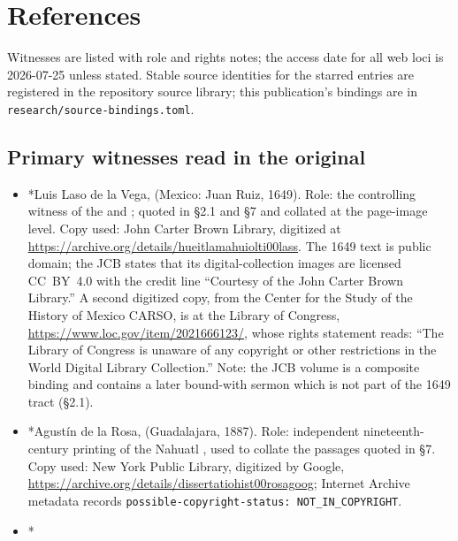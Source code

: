 \sectionguard
\section{References}

Witnesses are listed with role and rights notes; the access date for
all web loci is 2026-07-25 unless stated. Stable source identities for
the starred entries are registered in the repository source library;
this publication's bindings are in
\texttt{research/source-bindings.toml}.

\subsection*{Primary witnesses read in the original}

\begin{itemize}
\item *Luis Laso de la Vega, 
(Mexico: Juan Ruiz, 1649). Role: the controlling witness of the
 and ; quoted in \S2.1 and
\S7 and collated at the page-image level. Copy used: John Carter Brown
Library, digitized at
\url{https://archive.org/details/hueitlamahuiolti00lass}. The 1649 text
is public domain; the JCB states that its digital-collection images
are licensed CC~BY~4.0 with the credit line ``Courtesy of the John
Carter Brown Library.'' A second digitized copy, from the Center for
the Study of the History of Mexico CARSO, is at the Library of
Congress, \url{https://www.loc.gov/item/2021666123/}, whose rights
statement reads: ``The Library of Congress is unaware of any copyright
or other restrictions in the World Digital Library Collection.''
Note: the JCB volume is a composite binding and contains a later
bound-with sermon which is not part of the 1649 tract (\S2.1).
\item *Agust\'in de la Rosa,  (Guadalajara, 1887). Role:
independent nineteenth-century printing of the Nahuatl
, used to collate the passages quoted in \S7.
Copy used: New York Public Library, digitized by Google,
\url{https://archive.org/details/dissertatiohist00rosagoog}; Internet
Archive metadata records \texttt{possible-copyright-status:
NOT\_IN\_COPYRIGHT}.
\item *
\end{itemize}
